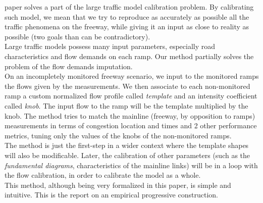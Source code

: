  paper solves a part of the large traffic model calibration problem. By calibrating such model, we mean that we try to reproduce as accurately as possible all the traffic phenomena on the freeway, while giving it an input as close to reality as possible (two goals than can be contradictory).\\
Large traffic models possess many input parameters, especially road characteristics and flow demands on each ramp. Our method partially solves the problem of the flow demands imputation.\\
On an incompletely monitored freeway scenario, we input to the monitored ramps the flows given by the measurements. We then associate to each non-monitored ramp a custom normalized flow profile called \emph{template} and an intensity coefficient called \emph{knob}. The input flow to the ramp will be the template multiplied by the knob. The method tries to match the mainline (freeway, by opposition to ramps) measurements in terms of congestion location and times and 2 other performance metrics, tuning only the values of the knobs of the non-monitored ramps.\\
The method is just the first-step in a wider context where the template shapes will also be modificable. Later, the calibration of other parameters (such as the \emph{fundamental diagrams}, characteristics of the mainline links) will be in a loop with the flow calibration, in order to calibrate the model as a whole.\\
This method, although being very formalized in this paper, is simple and intuitive. This is the report on an empirical progressive construction.
	
